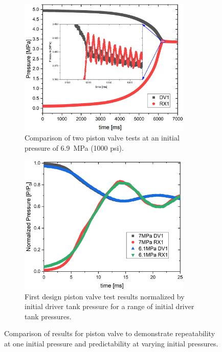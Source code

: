 \begin{figure}[bt]
    \centering
    \begin{subfigure}[t]{0.45\textwidth}
        \centering
        \includegraphics[width=0.9\textwidth]{results/plots/718psi_MTM_annu_failed_test.png}
        \caption{Comparison of two piston valve tests at an initial pressure of \SI{6.9}{\mega\pascal} (1000 psi).}
        \label{fig:piston 2 test}
    \end{subfigure}
    \hfill
    \begin{subfigure}[t]{0.45\textwidth}
        \centering
        \includegraphics[width=0.9\textwidth]{results/plots/Normalized_RX1_MtM_annular.png}
        \caption{First design piston valve test results normalized by initial driver tank pressure for a range of initial driver tank pressures.}
        \label{fig:norm}
    \end{subfigure}
    \caption{Comparison of results for piston valve to demonstrate repeatability at one initial pressure and predictability at varying initial pressures.}
    \label{fig:piston repeatability}
\end{figure}

